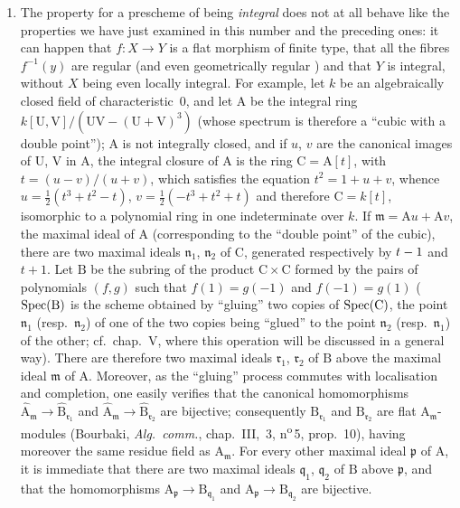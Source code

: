 \begin{remarks}[6.5.5]
\begin{enumerate}[label=(\roman*)]
  \item The property for a prescheme of being \emph{integral} does not at all behave like the properties we have just examined in this number and the preceding ones: it can happen that $f:X\to Y$ is a flat morphism of finite type, that all the fibres $f^{-1}(y)$ are regular (and even geometrically regular ) and that $Y$ is integral, without $X$ being even locally integral.
For example, let $k$ be an algebraically closed field of characteristic~$0$, and let $\mathrm{A}$ be the integral ring $k[\mathrm{U},\mathrm{V}]/(\mathrm{U}\mathrm{V}-(\mathrm{U}+\mathrm{V})^3)$ (whose spectrum is therefore a ``cubic with a double point''); $\mathrm{A}$ is not integrally closed, and if $u$, $v$ are the canonical images of $\mathrm{U}$, $\mathrm{V}$ in $\mathrm{A}$, the integral closure of $\mathrm{A}$ is the ring $\mathrm{C}=\mathrm{A}[t]$, with $t=(u-v)/(u+v)$, which satisfies the equation $t^2=1+u+v$, whence $u=\frac{1}{2}(t^3+t^2-t)$, $v=\frac{1}{2}(-t^3+t^2+t)$ and therefore $\mathrm{C}=k[t]$, isomorphic to a polynomial ring in one indeterminate over $k$.
If $\mathfrak{m}=\mathrm{A} u+\mathrm{A} v$, the maximal ideal of $\mathrm{A}$ (corresponding to the ``double point'' of the cubic), there are two maximal ideals $\mathfrak{n}_1$, $\mathfrak{n}_2$ of $\mathrm{C}$, generated respectively by $t- 1$ and $t+1$.
Let $\mathrm{B}$ be the subring of the product $\mathrm{C}\times\mathrm{C}$ formed by the pairs of polynomials $(f,g)$ such that $f(1)=g(-1)$ and $f(-1)=g(1)$ ($\operatorname{Spec}(\mathrm{B})$ is the scheme obtained by ``gluing'' two copies of $\operatorname{Spec}(\mathrm{C})$, the point $\mathfrak{n}_1$ (resp.\ $\mathfrak{n}_2$) of one of the two copies being ``glued'' to the point $\mathfrak{n}_2$ (resp.\ $\mathfrak{n}_1$) of the other; cf.\ chap.~V, where this operation will be discussed in a general way).
There are therefore two maximal ideals $\mathfrak{r}_1$, $\mathfrak{r}_2$ of $\mathrm{B}$ above the maximal ideal $\mathfrak{m}$ of $\mathrm{A}$.
Moreover, as the ``gluing'' process commutes with localisation and completion, one easily verifies that the canonical homomorphisms $\hat{\mathrm{A}}_\mathfrak{m}\to\hat{\mathrm{B}}_{\mathfrak{r}_1}$ and $\hat{\mathrm{A}}_\mathfrak{m}\to\hat{\mathrm{B}}_{\mathfrak{r}_2}$ are bijective; consequently $\mathrm{B}_{\mathfrak{r}_1}$ and $\mathrm{B}_{\mathfrak{r}_2}$ are flat $\mathrm{A}_\mathfrak{m}$-modules (Bourbaki, \emph{Alg.\ comm.}, chap.~III, \textsection\,3, n\textsuperscript{o}\,5, prop.~10), having moreover the same residue field as $\mathrm{A}_\mathfrak{m}$.
For every other maximal ideal $\mathfrak{p}$ of $\mathrm{A}$, it is immediate that there are two maximal ideals $\mathfrak{q}_1$, $\mathfrak{q}_2$ of $\mathrm{B}$ above $\mathfrak{p}$, and that the homomorphisms $\mathrm{A}_\mathfrak{p}\to\mathrm{B}_{\mathfrak{q}_1}$ and $\mathrm{A}_\mathfrak{p}\to\mathrm{B}_{\mathfrak{q}_2}$ are bijective.

\end{enumerate}
\end{remarks}
